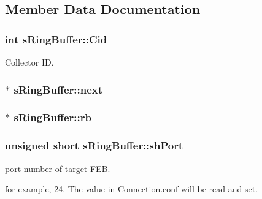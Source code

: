 \subsection{Member Data Documentation}
\subsubsection[{\texorpdfstring{Cid}{Cid}}]{\setlength{\rightskip}{0pt plus 5cm}int s\+Ring\+Buffer\+::\+Cid}\hypertarget{structsRingBuffer_ac518da2b168acdf6876786ad38465d3d}{}\label{structsRingBuffer_ac518da2b168acdf6876786ad38465d3d}


Collector ID. 

\subsubsection[{\texorpdfstring{next}{next}}]{$\ast$ s\+Ring\+Buffer\+::next}\hypertarget{structsRingBuffer_a3685b679b0732b84bbccb1f467638ea9}{}\label{structsRingBuffer_a3685b679b0732b84bbccb1f467638ea9}
\subsubsection[{\texorpdfstring{rb}{rb}}]{$\ast$ s\+Ring\+Buffer\+::rb}\hypertarget{structsRingBuffer_a02e62b51275c98f3e74e6b04d9f3ecb6}{}\label{structsRingBuffer_a02e62b51275c98f3e74e6b04d9f3ecb6}
\subsubsection[{\texorpdfstring{sh\+Port}{shPort}}]{\setlength{\rightskip}{0pt plus 5cm}unsigned short s\+Ring\+Buffer\+::sh\+Port}\hypertarget{structsRingBuffer_a38ec2d7373bbb5e89f7282c3de49e564}{}\label{structsRingBuffer_a38ec2d7373bbb5e89f7282c3de49e564}


port number of target F\+EB. 

for example, 24. The value in Connection.\+conf will be read and set. 
